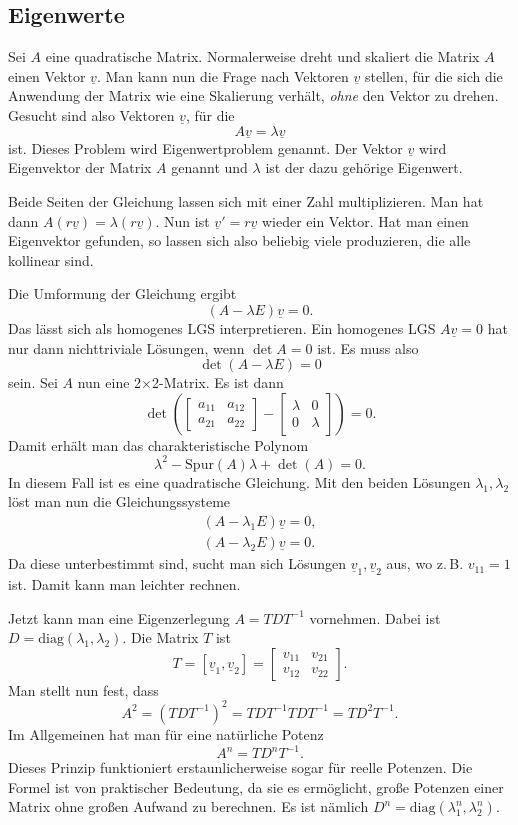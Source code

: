 \documentclass[a4paper,10pt,fleqn,twocolumn,twoside]{article}
\begin{document}
\subsection{Eigenwerte}

Sei $A$ eine quadratische Matrix. Normalerweise dreht und skaliert
die Matrix $A$ einen Vektor $\underline v$. Man kann nun die Frage
nach Vektoren $\underline v$ stellen, für die sich die Anwendung
der Matrix wie eine Skalierung verhält, \textit{ohne} den Vektor zu
drehen. Gesucht sind also Vektoren $\underline v$, für die
\[A\underline v = \lambda\underline v\]
ist. Dieses Problem wird Eigenwertproblem genannt. Der Vektor
$\underline v$ wird Eigenvektor der Matrix $A$ genannt und
$\lambda$ ist der dazu gehörige Eigenwert.

Beide Seiten der Gleichung lassen sich mit einer Zahl multiplizieren.
Man hat dann $A(r\underline v)=\lambda(r\underline v)$.
Nun ist $\underline v'=r\underline v$ wieder ein Vektor.
Hat man einen Eigenvektor gefunden, so lassen sich also beliebig
viele produzieren, die alle kollinear sind.

Die Umformung der Gleichung ergibt
\[(A-\lambda E)\underline v=0.\]
Das lässt sich als homogenes LGS interpretieren. Ein homogenes LGS
$A\underline v=0$ hat nur dann nichttriviale Lösungen,
wenn $\det A=0$ ist. Es muss also
\[\det(A-\lambda E)=0\]
sein. Sei $A$ nun eine 2$\times$2-Matrix. Es ist dann
\[\det\left(\begin{bmatrix}a_{11} & a_{12}\\
a_{21} & a_{22}\end{bmatrix}-
\begin{bmatrix}\lambda & 0\\
0 & \lambda\end{bmatrix}\right)=0.\]
Damit erhält man das charakteristische Polynom
\[\lambda^2 -\mathrm{Spur}(A)\lambda+\det(A)=0.\]
In diesem Fall ist es eine quadratische Gleichung.
Mit den beiden Lösungen $\lambda_1,\lambda_2$ löst man nun
die Gleichungssysteme
\begin{gather*}
(A-\lambda_1 E)\underline v=0,\\
(A-\lambda_2 E)\underline v=0.
\end{gather*}
Da diese unterbestimmt sind, sucht man sich Lösungen
$\underline v_1,\underline v_2$ aus, wo z.\,B. $v_{11}=1$ ist.
Damit kann man leichter rechnen.

Jetzt kann man eine Eigenzerlegung $A=TDT^{-1}$ vornehmen.
Dabei ist $D=\mathrm{diag}(\lambda_1,\lambda_2)$.
Die Matrix $T$ ist
\[T=[\underline v_1, \underline v_2]=\begin{bmatrix}
v_{11} & v_{21}\\
v_{12} & v_{22}
\end{bmatrix}.\]
Man stellt nun fest, dass
\[A^2 = (TDT^{-1})^2 = TDT^{-1}TDT^{-1} = TD^2T^{-1}.\]
Im Allgemeinen hat man für eine natürliche Potenz
\[A^n = TD^nT^{-1}.\]
Dieses Prinzip funktioniert erstaunlicherweise sogar für reelle
Potenzen. Die Formel ist von praktischer Bedeutung, da sie es
ermöglicht, große Potenzen einer Matrix ohne großen Aufwand zu
berechnen. Es ist nämlich
$D^n=\mathrm{diag}(\lambda_1^n,\lambda_2^n)$.
\end{document}
